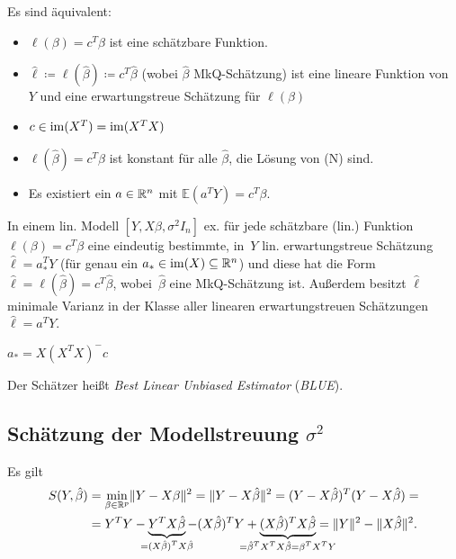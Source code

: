 \documentclass{cheat-sheet}
\newcommand{\E}{\mathbb{E}} %
\begin{document}

\begin{satz}
  Es sind äquivalent:
  \begin{itemize}
    \item $\ell(\beta) = c^T \beta$ ist eine schätzbare Funktion.
    \item $\hat{\ell} \coloneqq \ell(\hat{\beta}) \coloneqq c^T \hat{\beta}$ (wobei $\hat{\beta}$ MkQ-Schätzung) ist eine lineare Funktion von~$Y$ und eine erwartungstreue Schätzung für $\ell(\beta)$ %
    \item $c \in \operatorname{im}(X^T) = \operatorname{im}(X^T X)$
    \item $\ell(\hat{\beta}) = c^T \hat{\beta}$ ist konstant für alle $\hat{\beta}$, die Lösung von (N) sind.
    \item Es existiert ein $a \in \mathbb{R}^n$ mit $\E (a^T Y) = c^T \beta$.
  \end{itemize}
\end{satz}


\begin{satz}
  In einem lin. Modell $[Y, X \beta, \sigma^2 I_n]$ ex. für jede schätzbare (lin.) Funktion $\ell(\beta) = c^T \beta$ eine eindeutig bestimmte, in~$Y$ lin. erwartungstreue Schätzung $\hat{\ell} = a_*^T Y$ (für genau ein $a_* \in \operatorname{im}(X) \subseteq \mathbb{R}^n$) und diese hat die Form $\hat{\ell} = \ell(\hat{\beta}) = c^T \hat{\beta}$, wobei~$\hat{\beta}$ eine MkQ-Schätzung ist.
  Außerdem besitzt $\hat{\ell}$ minimale Varianz in der Klasse aller linearen erwartungstreuen Schätzungen $\hat{\ell} = a^T Y$.
\end{satz}

\begin{konstr}
  $a_* = X (X^T X)^{-} c$
\end{konstr}

\begin{defn}
  Der Schätzer heißt \textit{Best Linear Unbiased Estimator} (\emph{BLUE}).
\end{defn}

\subsection{Schätzung der Modellstreuung $\sigma^2$}

\begin{bem}
  Es gilt
  \begin{align*}
    S(Y, \hat{\beta}) & = \min_{\beta \in \R^p} \norm{Y - X \beta}^2 = \norm{Y - X \hat{\beta}}^2 = (Y - X \hat{\beta})^T (Y - X \hat{\beta}) = \\
    & = Y^T Y - \underbrace{Y^T X \hat{\beta}}_{\mathclap{= (X \hat{\beta})^T X \hat{\beta}}} - (X \hat{\beta})^T Y + \underbrace{(X \hat{\beta})^T X \hat{\beta}}_{\mathclap{= \hat{\beta}^T X^T X \hat{\beta} = \beta^T X^T Y}} = \norm{Y}^2 - \norm{X \hat{\beta}}^2.
  \end{align*}
\end{bem}
\end{document}
